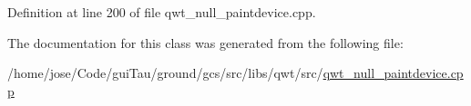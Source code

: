 Definition at line 200 of file qwt\-\_\-null\-\_\-paintdevice.\-cpp.



The documentation for this class was generated from the following file\-:\begin{DoxyCompactItemize}
\item 
/home/jose/\-Code/gui\-Tau/ground/gcs/src/libs/qwt/src/\hyperlink{qwt__null__paintdevice_8cpp}{qwt\-\_\-null\-\_\-paintdevice.\-cpp}\end{DoxyCompactItemize}
